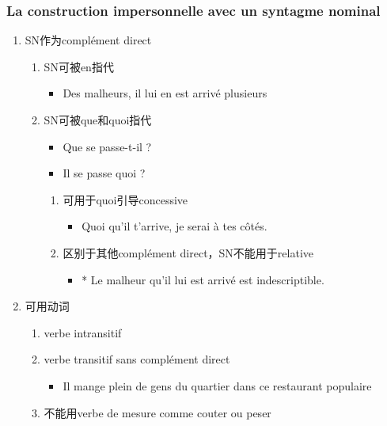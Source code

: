 \documentclass[UTF8]{report}
\begin{document}
\subsubsection{La construction impersonnelle avec un syntagme nominal}
\begin{enumerate}
    \item SN作为complément direct
    \begin{enumerate}
        \item SN可被en指代
        \begin{itemize}
            \item Des malheurs, il lui en est arrivé plusieurs
        \end{itemize}
        \item SN可被que和quoi指代
        \begin{itemize}
            \item Que se passe-t-il ?
            \item Il se passe quoi ?
        \end{itemize}
        \begin{enumerate}
            \item 可用于quoi引导concessive
            \begin{itemize}
                \item Quoi qu’il t’arrive, je serai à tes côtés.
            \end{itemize}
            \item 区别于其他complément direct，SN不能用于relative
            \begin{itemize}
                \item * Le malheur qu’il lui est arrivé est indescriptible.
            \end{itemize}
        \end{enumerate}
    \end{enumerate}
    \item 可用动词
    \begin{enumerate}
        \item verbe intransitif
        \item verbe transitif sans complément direct
        \begin{itemize}
            \item Il mange plein de gens du quartier dans ce restaurant populaire
        \end{itemize}
        \item 不能用verbe de mesure comme couter ou peser
        \begin{itemize}

\end{itemize}
\end{enumerate}
\end{enumerate}
\end{document}
